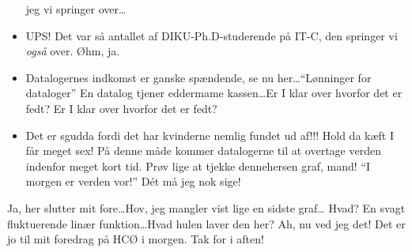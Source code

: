 \documentclass[danish]{article}
\begin{document}
\begin{sketch}
\begin{itemize}
  jeg vi springer over\ldots {}
\item \flip UPS!  Det var så antallet af DIKU-Ph.D-studerende på IT-C, den
  springer vi {\em også} over. Øhm, ja.
\item \flip {} Datalogernes indkomst er
  ganske spændende, se nu her\ldots ``Lønninger for dataloger'' En
  datalog tjener eddermame kassen\ldots Er I klar over hvorfor det er
  fedt?  Er I klar over hvorfor det er fedt?
\item \flip {}Det er sgudda fordi det har kvinderne nemlig
  fundet ud af!!!  Hold da kæft I får
  meget sex! På denne måde kommer datalogerne til at overtage verden
  indenfor meget kort tid. Prøv lige at tjekke dennehersen graf, mand!
  ``I morgen er verden vor!''  Dét må jeg nok sige!
\end{itemize}
 Ja, her slutter mit fore\ldots Hov, jeg mangler vist
lige en sidste graf\ldots {}
Hvad? En svagt fluktuerende linær funktion\ldots Hvad hulen laver den
her?  Ah,
nu ved jeg det! Det er jo til mit foredrag på HCØ i morgen. Tak for i
aften!
\end{sketch}
\end{document}
